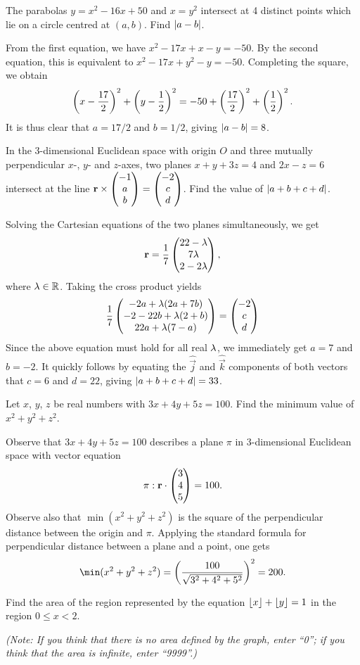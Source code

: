 \begin{question}[8]\label{A::2023-O-1-7}
    The parabolas $y = x^2 - 16x + 50$ and $x = y^2$ intersect at 4 distinct points which lie on a circle centred at $(a, b)$. Find $\left\lvert a - b \right\rvert$.
\end{question}

From the first equation, we have $x^2 - 17x + x - y = -50$. By the second equation, this is equivalent to $x^2 - 17x + y^2 - y = -50$. Completing the square, we obtain \[\left( x - \frac{17}2 \right)^2 + \left( y - \frac12 \right)^2 = -50 + \left( \frac{17}{2} \right)^2 + \left( \frac12 \right)^2.\] It is thus clear that $a = 17/2$ and $b = 1/2$, giving $\left\lvert a - b \right\rvert = 8$.

\begin{question}[33]\label{A::2023-O-1-8}
    In the 3-dimensional Euclidean space with origin $O$ and three mutually perpendicular $x$-, $y$- and $z$-axes, two planes $x + y + 3z = 4$ and $2x - z = 6$ intersect at the line $\mathbf{r} \times \begin{pmatrix} -1 \\ a \\ b \end{pmatrix} = \begin{pmatrix} -2 \\ c \\ d \end{pmatrix}$. Find the value of $\left\lvert a + b + c + d \right\rvert$.
\end{question}

Solving the Cartesian equations of the two planes simultaneously, we get \[\mathbf{r} = \dfrac17 \begin{pmatrix} 22-\lambda \\ 7\lambda \\ 2-2\lambda \end{pmatrix},\] where $\lambda \in \mathbb{R}$. Taking the cross product yields \[\dfrac17 \begin{pmatrix} -2a + \lambda(2a+7b) \\ -2-22b + \lambda(2+b) \\ 22a+\lambda(7-a) \end{pmatrix} = \begin{pmatrix} -2 \\ c \\ d \end{pmatrix}\] Since the above equation must hold for all real $\lambda$, we immediately get $a = 7$ and $b = -2$. It quickly follows by equating the $\hat {\vec j}$ and $\hat{\vec k}$ components of both vectors that $c = 6$ and $d = 22$, giving $\left\lvert a + b + c + d \right\rvert = 33$.

\begin{question}[200]\label{A::2023-O-1-9}
    Let $x$, $y$, $z$ be real numbers with $3x + 4y + 5z = 100$. Find the minimum value of $x^2 + y^2 + z^2$.
\end{question}

Observe that $3x + 4y + 5z = 100$ describes a plane $\pi$ in 3-dimensional Euclidean space with vector equation \[\pi: \mathbf{r} \cdot \begin{pmatrix} 3 \\ 4 \\ 5 \end{pmatrix} = 100.\] Observe also that $\min(x^2 + y^2 + z^2)$ is the square of the perpendicular distance between the origin and $\pi$. Applying the standard formula for perpendicular distance between a plane and a point, one gets \[\min(x^2 + y^2 + z^2) = \bp{\dfrac{100}{\sqrt{3^2 + 4^2 + 5^2}}}^2 = 200.\]

\begin{question}[2]\label{A::2023-O-1-10}
    Find the area of the region represented by the equation $\left\lfloor x \right\rfloor + \left\lfloor y \right\rfloor = 1$ in the region $0 \leq x < 2$.

    \noindent\textit{(Note: If you think that there is no area defined by the graph, enter ``0''; if you think that the area is infinite, enter ``9999''.)}
\end{question}

